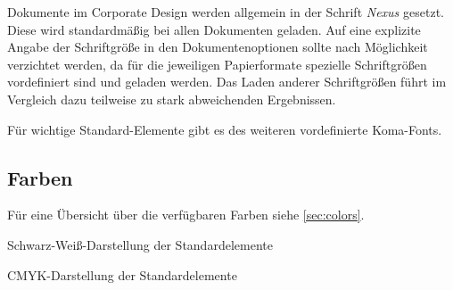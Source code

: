 Dokumente im Corporate Design werden allgemein in der Schrift \emph{Nexus}
gesetzt.
Diese wird standardmäßig bei allen Dokumenten geladen. Auf eine explizite
Angabe der Schriftgröße in den Dokumentenoptionen sollte nach Möglichkeit
verzichtet werden, da für die jeweiligen Papierformate spezielle
Schriftgrößen vordefiniert sind und geladen werden.
Das Laden anderer Schriftgrößen führt im Vergleich dazu teilweise zu stark abweichenden Ergebnissen.

Für wichtige Standard-Elemente gibt es des weiteren vordefinierte Koma-Fonts.


\begin{desctable}
\end{desctable}


\subsection{Farben}

Für eine Übersicht über die verfügbaren Farben siehe \ref{sec:colors}.%

\begin{Declaration}
\end{Declaration}

Schwarz-Weiß-Darstellung der Standardelemente

\begin{Declaration}
\end{Declaration}

CMYK-Darstellung der Standardelemente
